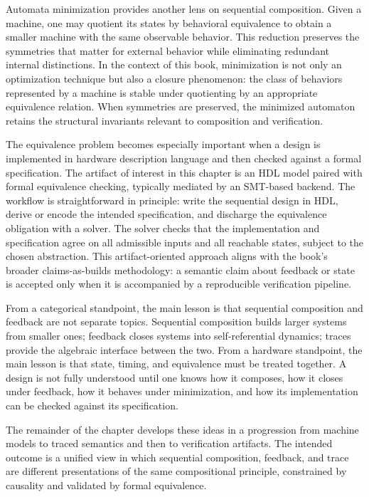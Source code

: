 Automata minimization provides another lens on sequential composition. Given a machine, one may quotient its states by behavioral equivalence to obtain a smaller machine with the same observable behavior. This reduction preserves the symmetries that matter for external behavior while eliminating redundant internal distinctions. In the context of this book, minimization is not only an optimization technique but also a closure phenomenon: the class of behaviors represented by a machine is stable under quotienting by an appropriate equivalence relation. When symmetries are preserved, the minimized automaton retains the structural invariants relevant to composition and verification.

The equivalence problem becomes especially important when a design is implemented in hardware description language and then checked against a formal specification. The artifact of interest in this chapter is an HDL model paired with formal equivalence checking, typically mediated by an SMT-based backend. The workflow is straightforward in principle: write the sequential design in HDL, derive or encode the intended specification, and discharge the equivalence obligation with a solver. The solver checks that the implementation and specification agree on all admissible inputs and all reachable states, subject to the chosen abstraction. This artifact-oriented approach aligns with the book's broader claims-as-builds methodology: a semantic claim about feedback or state is accepted only when it is accompanied by a reproducible verification pipeline.

From a categorical standpoint, the main lesson is that sequential composition and feedback are not separate topics. Sequential composition builds larger systems from smaller ones; feedback closes systems into self-referential dynamics; traces provide the algebraic interface between the two. From a hardware standpoint, the main lesson is that state, timing, and equivalence must be treated together. A design is not fully understood until one knows how it composes, how it closes under feedback, how it behaves under minimization, and how its implementation can be checked against its specification.

The remainder of the chapter develops these ideas in a progression from machine models to traced semantics and then to verification artifacts. The intended outcome is a unified view in which sequential composition, feedback, and trace are different presentations of the same compositional principle, constrained by causality and validated by formal equivalence.

